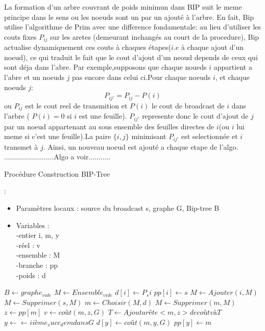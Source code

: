 La formation d'un arbre couvrant de poids minimun dans BIP suit le meme principe dans le sens ou les noeuds sont un par un ajouté à l'arbre.
En fait, Bip utilise l'algorithme de Prim avec une difference fondamentale: au lieu d'utiliser les couts fixes $P_{ij}$ sur les aretes (demeurant inchangés au court de la procedure),
Bip actualise dynamiquement ces couts à chaques étapes($i.e$ à chaque ajout d'un noeud), ce qui traduit le fait que le cout d'ajout d'un neoud depends de ceux qui sont déja dans l'abre.
Par exemple,supposons que chaque noueds $i$ appartient a l'abre et un noeuds $j$ pas encore dans celui ci.Pour chaque noeuds $i$, et chaque noeuds $j$:
$$P_{ij'}=P_{ij}-P(i)$$
ou $P_{ij}$ est le cout reel de transmition et $P(i)$ le cout de broadcast de $i$ dans l'arbre ( $P(i)=0$ si $i$ est une feuille). $P_{ij'}$ represente donc le cout d'ajout de $j$ par un noeud appartenant au sous ensemble des feuilles
 directes de $i$(ou $i$ lui meme si c'est une feuille).La paire $\{i,j\}$ minimisant $P_{ij'}$ est selectionnée et $i$ transmet à $j$. Ainsi, un nouveau noeud est ajouté a chaque etape de l'algo.\\

.........................Algo a voir...........

\begin{algorithm}[h]
\caption{Procédure Construction BIP-Tree}
\label{algo_LBIP_sp}
\begin{algorithmic}
\REQUIRE:
\begin{itemize}
 \item Paramètres locaux : source du broadcast s, graphe G, Bip-tree B
 \item  Variables : \\
  -entier i, m, y\\
  -réel : v\\
  -ensemble : M\\
  -branche : pp\\
  -poids : d \\
\end{itemize}


\STATE  $B \leftarrow graphe_{vide}$
\STATE  $M \leftarrow Ensemble_{vide}$
    \STATE $d[i] \leftarrow P_si$
    \STATE $pp[i] \leftarrow s$ 
    \STATE $M \leftarrow Ajouter (i,M)$
  \ENDFOR
  \STATE $M \leftarrow Supprimer (s,M)$
   \STATE $m \leftarrow Choisir (M,d)$
   \STATE $M \leftarrow Supprimer (m,M)$
   \STATE $z \leftarrow pp[m]$
   \STATE $v \leftarrow coût (m,z,G)$
   \STATE $T \leftarrow Ajout arête <m,z> de coût v à T$
     \STATE $y \leftarrow← i ième_succ_de m dans G$
       \STATE $d[y] \leftarrow coût(m,y,G)$
       \STATE $pp[y] \leftarrow m$
     \ENDIF
    \ENDFOR
\ENDWHILE


\end{algorithmic}
\end{algorithm}

